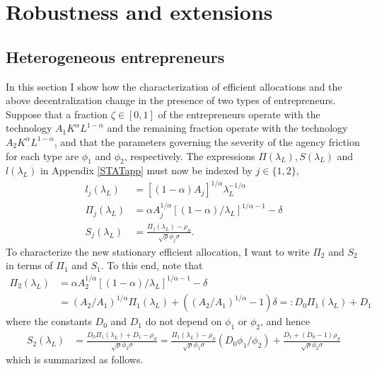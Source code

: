 \documentclass[11pt]{article}
\theoremstyle{plain}
\theoremstyle{definition} %
\begin{document}
\section{Robustness and extensions} \label{robust_app}


\subsection{Heterogeneous entrepreneurs} \label{hetero_ent}

In this section I show how the characterization of efficient allocations and the above decentralization change in the presence of two types of entrepreneurs. Suppose that a fraction $\zeta \in [0,1]$ of the entrepreneurs operate with the technology $A_1K^{\alpha}L^{1-\alpha}$ and the remaining fraction operate with the technology $A_2K^{\alpha}L^{1-\alpha}$, and that the parameters governing the severity of the agency friction for each type are $\phi_1$ and $\phi_2$, respectively. The expressions $\Pi(\lambda_L), S(\lambda_L)$ and $l(\lambda_L)$ in Appendix \ref{STATapp} must now be indexed by $j \in \{1,2\}$,
\begin{align*}
l_j(\lambda_L) & = [(1-\alpha)A_j]^{1/\alpha}\lambda_L^{-1/\alpha}
\\ \Pi_j(\lambda_L) & = \alpha A_j^{1/\alpha} [(1-\alpha)/\lambda_L]^{1/\alpha-1} - \delta
\\ S_j(\lambda_L) & = \frac{\Pi_j(\lambda_L) - \rho_S}{\sqrt{\rho} \phi_j \sigma}.
\end{align*}
To characterize the new stationary efficient allocation, I want to write $\Pi_2$ and $S_2$ in terms of $\Pi_1$ and $S_1$. To this end, note that
\begin{equation}
\begin{aligned}
\Pi_2(\lambda_L) & = \alpha A_2^{1/\alpha} [(1-\alpha)/\lambda_L]^{1/\alpha-1} - \delta
\\ & = (A_2/A_1)^{1/\alpha} \Pi_1(\lambda_L) + ((A_2/A_1)^{1/\alpha}-1)\delta
=: D_0\Pi_1(\lambda_L) + D_1
\end{aligned}
\label{pinned}
\end{equation}
where the constants $D_0$ and $D_1$ do not depend on $\phi_1$ or $\phi_2$, and hence
\begin{align*} 
S_2(\lambda_L) & = \frac{D_0\Pi_1(\lambda_L) + D_1 - \rho_S}{\sqrt{\rho} \phi_2 \sigma}
 = \frac{\Pi_1(\lambda_L) - \rho_S}{\sqrt{\rho} \phi_1 \sigma} (D_0\phi_1/\phi_2) + \frac{D_1 + (D_0 - 1)\rho_S}{\sqrt{\rho} \phi_2 \sigma} 
\end{align*}
which is summarized as follows. 
\end{document}
